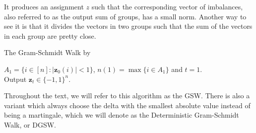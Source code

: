\documentclass[12pt]{article}
\begin{document}
It produces an assignment $z$ such that the corresponding vector of imbalances, also referred to as the output sum of groups, has a small norm. Another way to see it is that it divides the vectors in two groups such that the sum of the vectors in each group are pretty close.

\begin{algorithm}[H]
{\fontsize{10}{12}
\caption{The Gram-Schmidt Walk by \cite{blues}}
   $A_1=\{i\in[n]:|\textbf{z}_0(i)|<1\}$, $n(1) = \max \{i \in A_1\}$ and $t=1$.\\
    Output $\textbf{z}_t\in\{-1,1\}^n$.
    \label{walk}
    }%
    \end{algorithm}
Throughout the text, we will refer to this algorithm as the GSW. There is also a variant which always choose the delta with the smallest absolute value instead of being a martingale, which we will denote as the Deterministic Gram-Schmidt Walk, or DGSW. 
\end{document}
